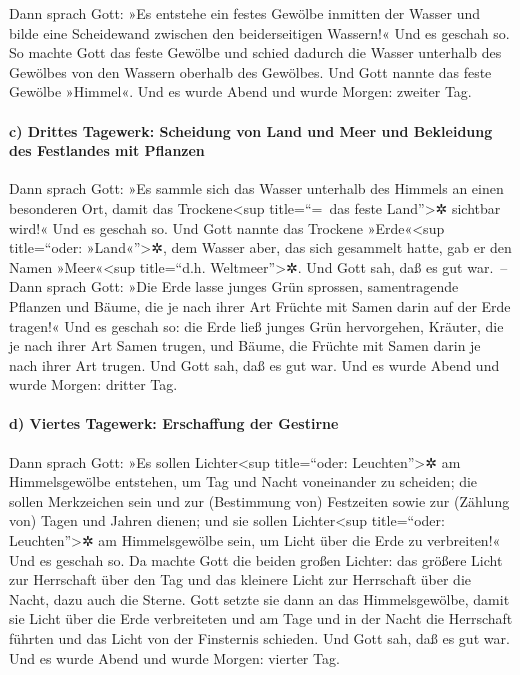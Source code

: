  Dann sprach Gott: »Es entstehe ein festes Gewölbe
inmitten der Wasser und bilde eine Scheidewand zwischen den
beiderseitigen Wassern!« Und es geschah so.  So machte
Gott das feste Gewölbe und schied dadurch die Wasser unterhalb des
Gewölbes von den Wassern oberhalb des Gewölbes.  Und Gott
nannte das feste Gewölbe »Himmel«. Und es wurde Abend und wurde Morgen:
zweiter Tag.

\hypertarget{c-drittes-tagewerk-scheidung-von-land-und-meer-und-bekleidung-des-festlandes-mit-pflanzen}{%
\paragraph{c) Drittes Tagewerk: Scheidung von Land und Meer und
Bekleidung des Festlandes mit
Pflanzen}\label{c-drittes-tagewerk-scheidung-von-land-und-meer-und-bekleidung-des-festlandes-mit-pflanzen}}

 Dann sprach Gott: »Es sammle sich das Wasser unterhalb
des Himmels an einen besonderen Ort, damit das Trockene\textless sup
title=``=~das feste Land''\textgreater✲ sichtbar wird!« Und es geschah
so.  Und Gott nannte das Trockene »Erde«\textless sup
title=``oder: »Land«''\textgreater✲, dem Wasser aber, das sich gesammelt
hatte, gab er den Namen »Meer«\textless sup title=``d.h.
Weltmeer''\textgreater✲. Und Gott sah, daß es gut war.~--
 Dann sprach Gott: »Die Erde lasse junges Grün sprossen,
samentragende Pflanzen und Bäume, die je nach ihrer Art Früchte mit
Samen darin auf der Erde tragen!« Und es geschah so:  die
Erde ließ junges Grün hervorgehen, Kräuter, die je nach ihrer Art Samen
trugen, und Bäume, die Früchte mit Samen darin je nach ihrer Art trugen.
Und Gott sah, daß es gut war.  Und es wurde Abend und
wurde Morgen: dritter Tag.

\hypertarget{d-viertes-tagewerk-erschaffung-der-gestirne}{%
\paragraph{d) Viertes Tagewerk: Erschaffung der
Gestirne}\label{d-viertes-tagewerk-erschaffung-der-gestirne}}

 Dann sprach Gott: »Es sollen Lichter\textless sup
title=``oder: Leuchten''\textgreater✲ am Himmelsgewölbe entstehen, um
Tag und Nacht voneinander zu scheiden; die sollen Merkzeichen sein und
zur (Bestimmung von) Festzeiten sowie zur (Zählung von) Tagen und Jahren
dienen;  und sie sollen Lichter\textless sup
title=``oder: Leuchten''\textgreater✲ am Himmelsgewölbe sein, um Licht
über die Erde zu verbreiten!« Und es geschah so.  Da
machte Gott die beiden großen Lichter: das größere Licht zur Herrschaft
über den Tag und das kleinere Licht zur Herrschaft über die Nacht, dazu
auch die Sterne.  Gott setzte sie dann an das
Himmelsgewölbe, damit sie Licht über die Erde verbreiteten
 und am Tage und in der Nacht die Herrschaft führten und
das Licht von der Finsternis schieden. Und Gott sah, daß es gut war.
 Und es wurde Abend und wurde Morgen: vierter Tag.

